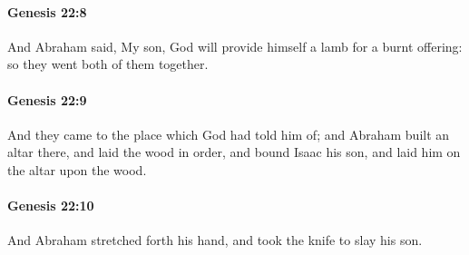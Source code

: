 		\paragraph{Genesis 22:8} %
			\label{GENESIS-22-8}

			And Abraham said, My son, God will provide himself a lamb for a burnt offering: so they went both of them together.


		\paragraph{Genesis 22:9} %
			\label{GENESIS-22-9}

			And they came to the place which God had told him of; and Abraham built an altar there, and laid the wood in order, and bound Isaac his son, and laid him on the altar upon the wood.


		\paragraph{Genesis 22:10} %
			\label{GENESIS-22-10}

			And Abraham stretched forth his hand, and took the knife to slay his son.


